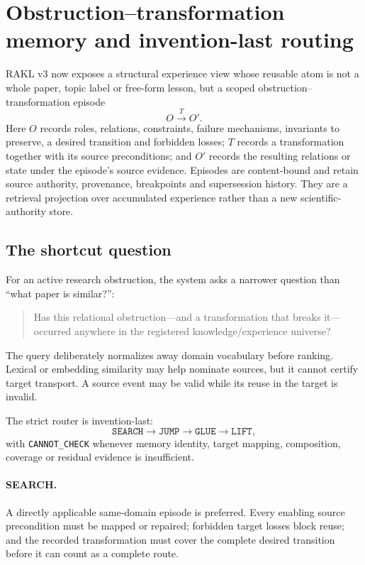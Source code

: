 \section{Obstruction--transformation memory and invention-last routing}
\label{sec:semantic-shortcut}

RAKL v3 now exposes a structural experience view whose reusable atom is not a whole paper, topic label or free-form lesson, but a scoped obstruction--transformation episode
\begin{equation}
O\xrightarrow{T}O'.
\end{equation}
Here $O$ records roles, relations, constraints, failure mechanisms, invariants to preserve, a desired transition and forbidden losses; $T$ records a transformation together with its source preconditions; and $O'$ records the resulting relations or state under the episode's source evidence. Episodes are content-bound and retain source authority, provenance, breakpoints and supersession history. They are a retrieval projection over accumulated experience rather than a new scientific-authority store.

\subsection{The shortcut question}

For an active research obstruction, the system asks a narrower question than ``what paper is similar?'':

\begin{quote}
Has this relational obstruction---and a transformation that breaks it---occurred anywhere in the registered knowledge/experience universe?
\end{quote}

The query deliberately normalizes away domain vocabulary before ranking. Lexical or embedding similarity may help nominate sources, but it cannot certify target transport. A source event may be valid while its reuse in the target is invalid.

The strict router is invention-last:
\begin{equation}
\texttt{SEARCH}\rightarrow\texttt{JUMP}\rightarrow\texttt{GLUE}\rightarrow\texttt{LIFT},
\end{equation}
with \texttt{CANNOT\_CHECK} whenever memory identity, target mapping, composition, coverage or residual evidence is insufficient.

\paragraph{SEARCH.}
A directly applicable same-domain episode is preferred. Every enabling source precondition must be mapped or repaired; forbidden target losses block reuse; and the recorded transformation must cover the complete desired transition before it can count as a complete route.

